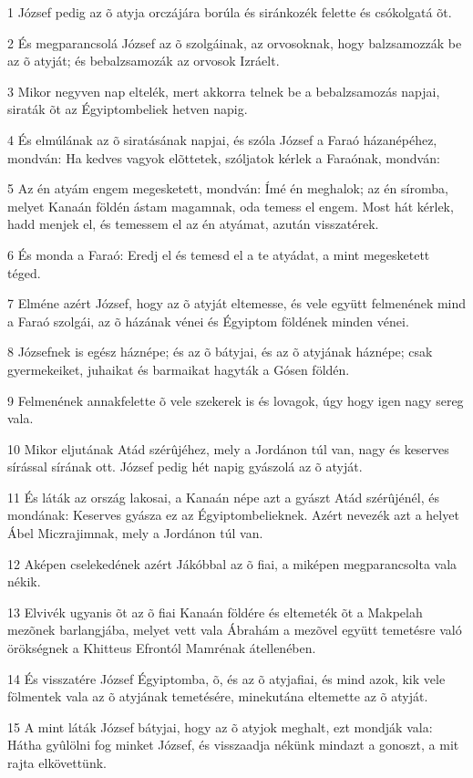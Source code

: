 \par 1 József pedig az õ atyja orczájára borúla és siránkozék felette és csókolgatá õt.
\par 2 És megparancsolá József az õ szolgáinak, az orvosoknak, hogy balzsamozzák be az õ atyját; és bebalzsamozák az orvosok Izráelt.
\par 3 Mikor negyven nap eltelék, mert akkorra telnek be a bebalzsamozás napjai, siraták õt az Égyiptombeliek hetven napig.
\par 4 És elmúlának az õ siratásának napjai, és szóla József a Faraó házanépéhez, mondván: Ha kedves vagyok elõttetek, szóljatok kérlek a Faraónak, mondván:
\par 5 Az én atyám engem megesketett, mondván: Ímé én meghalok; az én síromba, melyet Kanaán földén ástam magamnak, oda temess el engem. Most hát kérlek, hadd menjek el, és temessem el az én atyámat, azután visszatérek.
\par 6 És monda a Faraó: Eredj el és temesd el a te atyádat, a mint megesketett téged.
\par 7 Elméne azért József, hogy az õ atyját eltemesse, és vele együtt felmenének mind a Faraó szolgái, az õ házának vénei és Égyiptom földének minden vénei.
\par 8 Józsefnek is egész háznépe; és az õ bátyjai, és az õ atyjának háznépe; csak gyermekeiket, juhaikat és barmaikat hagyták a Gósen földén.
\par 9 Felmenének annakfelette õ vele szekerek is és lovagok, úgy hogy igen nagy sereg vala.
\par 10 Mikor eljutának Atád szérûjéhez, mely a Jordánon túl van, nagy és keserves sírással sírának ott. József pedig hét napig gyászolá az õ atyját.
\par 11 És láták az ország lakosai, a Kanaán népe azt a gyászt Atád szérûjénél, és mondának: Keserves gyásza ez az Égyiptombelieknek. Azért nevezék azt a helyet Ábel Miczrajimnak, mely a Jordánon túl van.
\par 12 Aképen cselekedének azért Jákóbbal az õ fiai, a miképen megparancsolta vala nékik.
\par 13 Elvivék ugyanis õt az õ fiai Kanaán földére és eltemeték õt a Makpelah mezõnek barlangjába, melyet vett vala Ábrahám a mezõvel együtt temetésre való örökségnek  a Khitteus Efrontól Mamrénak átellenében.
\par 14 És visszatére József Égyiptomba, õ, és az õ atyjafiai, és mind azok, kik vele fölmentek vala az õ atyjának temetésére, minekutána eltemette az õ atyját.
\par 15 A mint láták József bátyjai, hogy az õ atyjok meghalt, ezt mondják vala: Hátha gyûlölni fog minket József, és visszaadja nékünk mindazt a gonoszt, a mit rajta elkövettünk.
